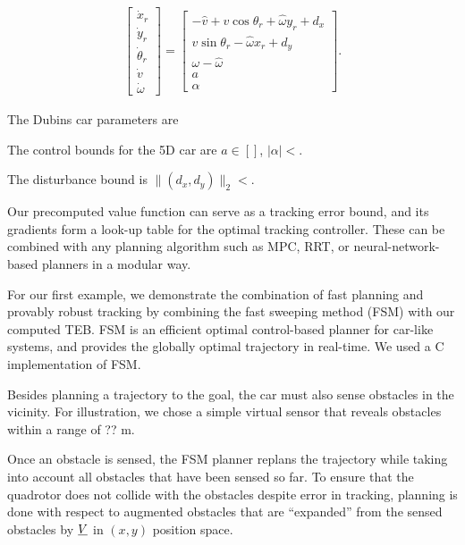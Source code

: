 \begin{equation}
\label{eq:5D_and_3D_rdyn}
\begin{aligned}
\left[
\begin{array}{c}
\dot x_r\\
\dot y_r\\
\dot\theta_r\\
\dot v\\
\dot \omega
\end{array}
\right]
=
\left[
\begin{array}{c}
- \hat v + v \cos \theta_r + \hat \omega y_r + d_x\\
v \sin \theta_r - \hat \omega x_r + d_y\\
\omega - \hat \omega \\
a\\
\alpha
\end{array}
\right].
\end{aligned}
\end{equation}

The Dubins car parameters are

The control bounds for the 5D car are $a \in []$, $|\alpha| < $.

The disturbance bound is $\|(d_x, d_y)\|_2 < $.



Our precomputed value function can serve as a tracking error bound, and its gradients form a look-up table for the optimal tracking controller. These can be combined with any planning algorithm such as MPC, RRT, or neural-network-based planners in a modular way. 

For our first example, we demonstrate the combination of fast planning and provably robust tracking by combining the fast sweeping method (FSM) \cite{} with our computed TEB. FSM is an efficient optimal control-based planner for car-like systems, and provides the globally optimal trajectory in real-time. We used a C implementation of FSM.

Besides planning a trajectory to the goal, the car must also sense obstacles in the vicinity. For illustration, we chose a simple virtual sensor that reveals obstacles within a range of ?? m.

Once an obstacle is sensed, the FSM planner replans the trajectory while taking into account all obstacles that have been sensed so far. 
To ensure that the quadrotor does not collide with the obstacles despite error in tracking, planning is done with respect to augmented obstacles that are ``expanded'' from the sensed obstacles by $\underline{V}$ in $(x,y)$ position space.

